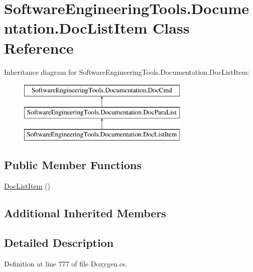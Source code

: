\hypertarget{class_software_engineering_tools_1_1_documentation_1_1_doc_list_item}{\section{Software\+Engineering\+Tools.\+Documentation.\+Doc\+List\+Item Class Reference}
\label{class_software_engineering_tools_1_1_documentation_1_1_doc_list_item}
}
Inheritance diagram for Software\+Engineering\+Tools.\+Documentation.\+Doc\+List\+Item\+:\begin{figure}[H]
\begin{center}
\leavevmode
\includegraphics[height=3.000000cm]{class_software_engineering_tools_1_1_documentation_1_1_doc_list_item}
\end{center}
\end{figure}
\subsection*{Public Member Functions}
\begin{DoxyCompactItemize}
\item 
\hyperlink{class_software_engineering_tools_1_1_documentation_1_1_doc_list_item_ad174681536e6a05bef68c390cf7da8f9}{Doc\+List\+Item} ()
\end{DoxyCompactItemize}
\subsection*{Additional Inherited Members}


\subsection{Detailed Description}


Definition at line 777 of file Doxygen.\+cs.



